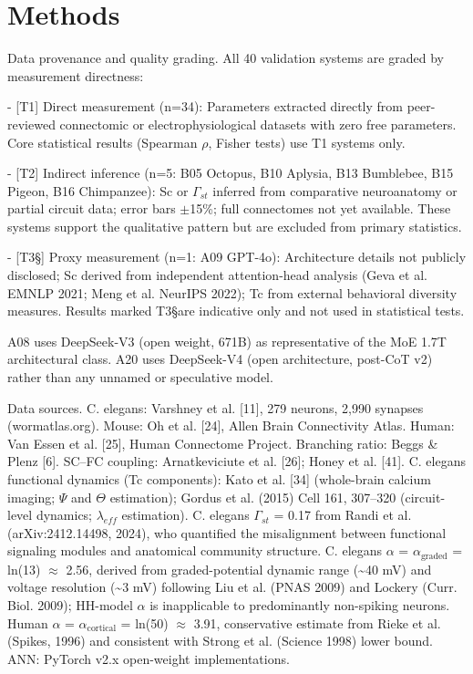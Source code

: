\documentclass[a4paper,12pt]{article}
\begin{document}
\section{Methods}

Data provenance and quality grading. All 40 validation systems are graded by measurement directness:


- [T1] Direct measurement (n=34): Parameters extracted directly from peer-reviewed connectomic or electrophysiological datasets with zero free parameters. Core statistical results (Spearman $\rho$, Fisher tests) use T1 systems only.


- [T2\dag] Indirect inference (n=5: B05 Octopus, B10 Aplysia, B13 Bumblebee, B15 Pigeon, B16 Chimpanzee): Sc or $\Gamma_{st}$ inferred from comparative neuroanatomy or partial circuit data; error bars $\pm$15\%; full connectomes not yet available. These systems support the qualitative pattern but are excluded from primary statistics.


- [T3\S] Proxy measurement (n=1: A09 GPT-4o): Architecture details not publicly disclosed; Sc derived from independent attention-head analysis (Geva et al. EMNLP 2021; Meng et al. NeurIPS 2022); Tc from external behavioral diversity measures. Results marked T3\S are indicative only and not used in statistical tests.


A08 uses DeepSeek-V3 (open weight, 671B) as representative of the MoE 1.7T architectural class. A20 uses DeepSeek-V4 (open architecture, post-CoT v2) rather than any unnamed or speculative model.


Data sources.
C. elegans: Varshney et al. [11], 279 neurons, 2,990 synapses (wormatlas.org).
Mouse: Oh et al. [24], Allen Brain Connectivity Atlas.
Human: Van Essen et al. [25], Human Connectome Project.
Branching ratio: Beggs \& Plenz [6].
SC--FC coupling: Arnatkeviciute et al. [26]; Honey et al. [41].
C. elegans functional dynamics (Tc components): Kato et al. [34] (whole-brain calcium imaging; $\Psi$ and $\Theta$ estimation); Gordus et al. (2015) Cell 161, 307--320 (circuit-level dynamics; $\lambda_{eff}$ estimation).
C. elegans $\Gamma_{st}$ = 0.17 from Randi et al. (arXiv:2412.14498, 2024), who quantified the misalignment between functional signaling modules and anatomical community structure.
C. elegans $\alpha$ = $\alpha_{\text{graded}}$ = ln(13) $\approx$ 2.56, derived from graded-potential dynamic range (\textasciitilde{}40 mV) and voltage resolution (\textasciitilde{}3 mV) following Liu et al. (PNAS 2009) and Lockery (Curr.
Biol. 2009); HH-model $\alpha$ is inapplicable to predominantly non-spiking neurons.
Human $\alpha$ = $\alpha_{\text{cortical}}$ = ln(50) $\approx$ 3.91, conservative estimate from Rieke et al. (Spikes, 1996) and consistent with Strong et al. (Science 1998) lower bound.
ANN: PyTorch v2.x open-weight implementations.
\end{document}
